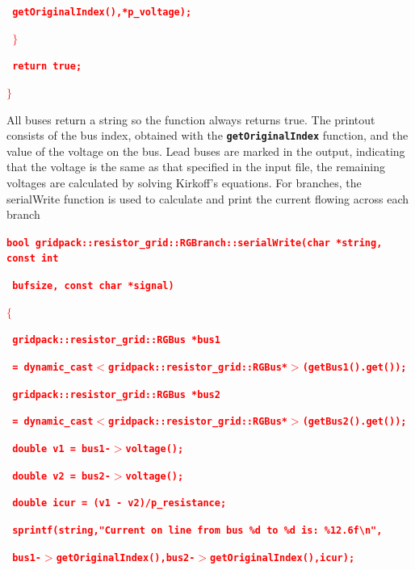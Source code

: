 \documentclass[12pt]{report} %
\begin{document}
\textcolor{red}{\texttt{\textbf{        getOriginalIndex(),*p\_voltage);}}}

\textcolor{red}{\texttt{\textbf{  $\boldsymbol{\mathrm{\}}}$}}}

\textcolor{red}{\texttt{\textbf{  return true;}}}

\textcolor{red}{\texttt{\textbf{$\boldsymbol{\mathrm{\}}}$}}}

All buses return a string so the function always returns true. The printout consists of the bus index, obtained with the \texttt{\textbf{getOriginalIndex}} function, and the value of the voltage on the bus. Lead buses are marked in the output, indicating that the voltage is the same as that specified in the input file, the remaining voltages are calculated by solving Kirkoff's equations. For branches, the serialWrite function is used to calculate and print the current flowing across each branch

\textcolor{red}{\texttt{\textbf{bool gridpack::resistor\_grid::RGBranch::serialWrite(char *string, const int}}}

\textcolor{red}{\texttt{\textbf{    bufsize,  const char *signal)}}}

\textcolor{red}{\texttt{\textbf{$\boldsymbol{\mathrm{\{}}$}}}

\textcolor{red}{\texttt{\textbf{}}}

\textcolor{red}{\texttt{\textbf{  gridpack::resistor\_grid::RGBus *bus1}}}

\textcolor{red}{\texttt{\textbf{    = dynamic\_cast$\boldsymbol{\mathrm{<}}$gridpack::resistor\_grid::RGBus*$\boldsymbol{\mathrm{>}}$(getBus1().get());}}}

\textcolor{red}{\texttt{\textbf{  gridpack::resistor\_grid::RGBus *bus2}}}

\textcolor{red}{\texttt{\textbf{    = dynamic\_cast$\boldsymbol{\mathrm{<}}$gridpack::resistor\_grid::RGBus*$\boldsymbol{\mathrm{>}}$(getBus2().get());}}}

\textcolor{red}{\texttt{\textbf{  double v1 = bus1-$\boldsymbol{\mathrm{>}}$voltage();}}}

\textcolor{red}{\texttt{\textbf{  double v2 = bus2-$\boldsymbol{\mathrm{>}}$voltage();}}}

\textcolor{red}{\texttt{\textbf{  double icur = (v1 - v2)/p\_resistance;}}}

\textcolor{red}{\texttt{\textbf{  sprintf(string,"Current on line from bus \%d to \%d is: \%12.6f{\textbackslash}n",}}}

\textcolor{red}{\texttt{\textbf{      bus1-$\boldsymbol{\mathrm{>}}$getOriginalIndex(),bus2-$\boldsymbol{\mathrm{>}}$getOriginalIndex(),icur);}}}
\end{document}

